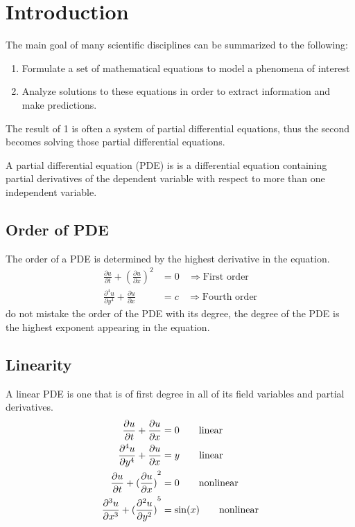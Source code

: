 \documentclass[]{article}
\begin{document}
\newpage

\tableofcontents

\newpage

\section{Introduction}
The main goal of many scientific disciplines can be summarized to the following:

\begin{enumerate}
\item Formulate a set of mathematical equations to model a phenomena of interest
\item Analyze solutions to these equations in order to extract information and make predictions.
\end{enumerate}

The result of 1 is often a system of partial differential equations, thus the second becomes solving those partial differential equations.
\par
A partial differential equation (PDE) is is a differential equation containing partial derivatives of the dependent variable with respect to more than one independent variable.

\subsection{Order of PDE}
The order of a PDE is determined by the highest derivative in the equation.
\begin{align*}
\frac{\partial u}{\partial t} + {(\frac{\partial u}{\partial x})}^2 &= 0 \ \ \ \ \Longrightarrow  \text{First order}
\\
\frac{\partial^4 u}{\partial y^4} + \frac{\partial u}{\partial x} &= c \ \ \ \ \Longrightarrow  \text{Fourth order}
\end{align*}
do not mistake the order of the PDE with its degree, the degree of the PDE is the highest exponent appearing in the equation.
\subsection{Linearity} 
A linear PDE is one that is of first degree in all of its field variables and partial derivatives.
\begin{align*}
\frac{\partial u}{\partial t} + \frac{\partial u}{\partial x} &= 0 \quad\quad \text{linear}
\\
\frac{\partial^4 u}{\partial y^4} + \frac{\partial u}{\partial x} &= y \quad\quad \text{linear}
\\
\frac{\partial u}{\partial t} + {(\frac{\partial u}{\partial x})}^2 &= 0 \quad\quad \text{nonlinear}
\\
\frac{\partial^3 u}{\partial x^3} + {(\frac{\partial^2 u}{\partial y^2})}^5 &= \sin(x) \quad\quad \text{nonlinear}
\end{align*}
\end{document}
